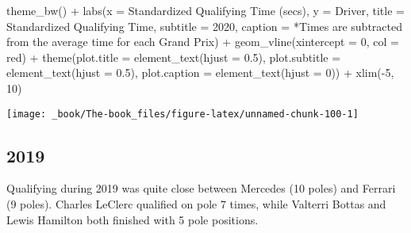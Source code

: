 \documentclass[
]{book}
\newenvironment{Shaded}{\begin{snugshade}}{\end{snugshade}}
\newcommand{\AttributeTok}[1]{\textcolor[rgb]{0.77,0.63,0.00}{#1}}
\newcommand{\DecValTok}[1]{\textcolor[rgb]{0.00,0.00,0.81}{#1}}
\newcommand{\FloatTok}[1]{\textcolor[rgb]{0.00,0.00,0.81}{#1}}
\newcommand{\FunctionTok}[1]{\textcolor[rgb]{0.00,0.00,0.00}{#1}}
\newcommand{\NormalTok}[1]{#1}
\newcommand{\SpecialCharTok}[1]{\textcolor[rgb]{0.00,0.00,0.00}{#1}}
\newcommand{\StringTok}[1]{\textcolor[rgb]{0.31,0.60,0.02}{#1}}
\begin{document}
\begin{Shaded}
\begin{Highlighting}[]
  \FunctionTok{theme\_bw}\NormalTok{() }\SpecialCharTok{+}
  \FunctionTok{labs}\NormalTok{(}\AttributeTok{x =} \StringTok{\textquotesingle{}Standardized Qualifying Time (secs)\textquotesingle{}}\NormalTok{,}
       \AttributeTok{y =} \StringTok{\textquotesingle{}Driver\textquotesingle{}}\NormalTok{,}
       \AttributeTok{title =} \StringTok{\textquotesingle{}Standardized Qualifying Time\textquotesingle{}}\NormalTok{,}
       \AttributeTok{subtitle =} \StringTok{\textquotesingle{}2020\textquotesingle{}}\NormalTok{,}
       \AttributeTok{caption =} \StringTok{\textquotesingle{}*Times are subtracted from the average time for each Grand Prix\textquotesingle{}}\NormalTok{) }\SpecialCharTok{+}
  \FunctionTok{geom\_vline}\NormalTok{(}\AttributeTok{xintercept =} \DecValTok{0}\NormalTok{, }\AttributeTok{col =} \StringTok{\textquotesingle{}red\textquotesingle{}}\NormalTok{) }\SpecialCharTok{+}
  \FunctionTok{theme}\NormalTok{(}\AttributeTok{plot.title =} \FunctionTok{element\_text}\NormalTok{(}\AttributeTok{hjust =} \FloatTok{0.5}\NormalTok{),}
        \AttributeTok{plot.subtitle =} \FunctionTok{element\_text}\NormalTok{(}\AttributeTok{hjust =} \FloatTok{0.5}\NormalTok{),}
        \AttributeTok{plot.caption =} \FunctionTok{element\_text}\NormalTok{(}\AttributeTok{hjust =} \DecValTok{0}\NormalTok{)) }\SpecialCharTok{+}
  \FunctionTok{xlim}\NormalTok{(}\SpecialCharTok{{-}}\DecValTok{5}\NormalTok{, }\DecValTok{10}\NormalTok{)}
\end{Highlighting}
\end{Shaded}

\begin{center}\texttt{[image: \_book/The-book\_files/figure-latex/unnamed-chunk-100-1]} \end{center}

\hypertarget{section-4}{%
\subsection{2019}\label{section-4}}

Qualifying during 2019 was quite close between Mercedes (10 poles) and Ferrari (9 poles). Charles LeClerc qualified on pole 7 times, while Valterri Bottas and Lewis Hamilton both finished with 5 pole positions.
\end{document}
